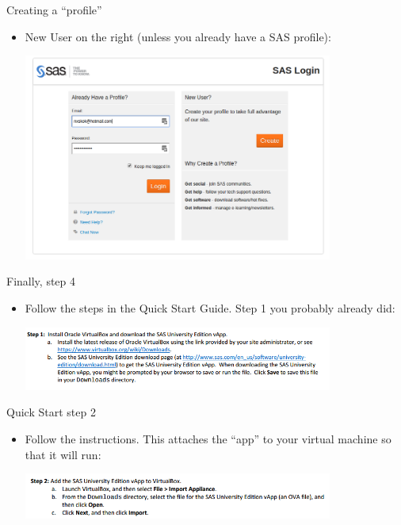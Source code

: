 \documentclass[unknownkeysallowed]{beamer}\usepackage[]{graphicx}\usepackage[]{color}
\begin{document}
\begin{frame}[fragile]{Creating a ``profile''}
  
  \begin{itemize}
  \item New User on the right (unless you already have a SAS profile):

      \includegraphics[width=4in]{sas22}

  \end{itemize}
  
  
\end{frame}

\begin{frame}[fragile]{Finally, step 4}
  
  \begin{itemize}
  \item Follow the steps in the Quick Start Guide. Step 1 you probably
    already did:
    
    \includegraphics[width=4in]{sas23}
  \end{itemize}
  
\end{frame}

\begin{frame}[fragile]{Quick Start step 2}
  
  \begin{itemize}
  \item Follow the instructions. This attaches the ``app'' to your
    virtual machine so that it will run:
    
    \includegraphics[width=4in]{sas24}
  \end{itemize}
  
\end{frame}
\end{document}
